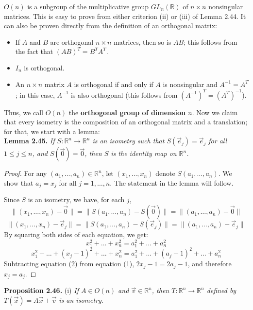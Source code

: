 \documentclass[leqno]{book}
\begin{document}
\noindent $O(n)$ is a subgroup of the multiplicative group $GL_n(\mathbb R)$ of $n\times n$ nonsingular matrices.  This is easy to prove from either criterion (ii) or (iii) of Lemma 2.44.  It can also be proven directly from the definition of an orthogonal matrix:
\begin{itemize}
\item If $A$ and $B$ are orthogonal $n\times n$ matrices, then so is $AB$; this follows from the fact that $(AB)^T=B^TA^T$.

\item $I_n$ is orthogonal.

\item An $n\times n$ matrix $A$ is orthogonal if and only if $A$ is nonsingular and $A^{-1}=A^T$; in this case, $A^{-1}$ is also orthogonal (this follows from $(A^{-1})^T=(A^T)^{-1}$).
\end{itemize}
Thus, we call $O(n)$ the \textbf{orthogonal group of dimension $n$}.  Now we claim that every isometry is the composition of an orthogonal matrix and a translation; for that, we start with a lemma:\\

\noindent\textbf{Lemma 2.45.} \emph{If $S:\mathbb R^n\to\mathbb R^n$ is an isometry such that $S(\vec e_j)=\vec e_j$ for all $1\leqslant j\leqslant n$, and $S(\vec 0)=\vec 0$, then $S$ is the identity map on $\mathbb R^n$.}
\begin{proof}
For any $(a_1,\dots,a_n)\in\mathbb R^n$, let $(x_1,\dots,x_n)$ denote $S(a_1,\dots,a_n)$.  We show that $a_j=x_j$ for all $j=1,\dots,n$.  The statement in the lemma will follow.

Since $S$ is an isometry, we have, for each $j$,
$$\|(x_1,\dots,x_n)-\vec 0\|=\|S(a_1,\dots,a_n)-S(\vec 0)\|=\|(a_1,\dots,a_n)-\vec 0\|$$
$$\|(x_1,\dots,x_n)-\vec e_j\|=\|S(a_1,\dots,a_n)-S(\vec e_j)\|=\|(a_1,\dots,a_n)-\vec e_j\|$$
By squaring both sides of each equation, we get:
\begin{equation}\tag{1}
x_1^2+\dots+x_n^2=a_1^2+\dots+a_n^2
\end{equation}
\begin{equation}\tag{2}
x_1^2+\dots+(x_j-1)^2+\dots+x_n^2=a_1^2+\dots+(a_j-1)^2+\dots+a_n^2
\end{equation}
Subtracting equation (2) from equation (1), $2x_j-1=2a_j-1$, and therefore $x_j=a_j$.
\end{proof}
\noindent\textbf{Proposition 2.46.} (i) \emph{If $A\in O(n)$ and $\vec v\in\mathbb R^n$, then $T:\mathbb R^n\to\mathbb R^n$ defined by $T(\vec x)=A\vec x+\vec v$ is an isometry.}
\end{document}

